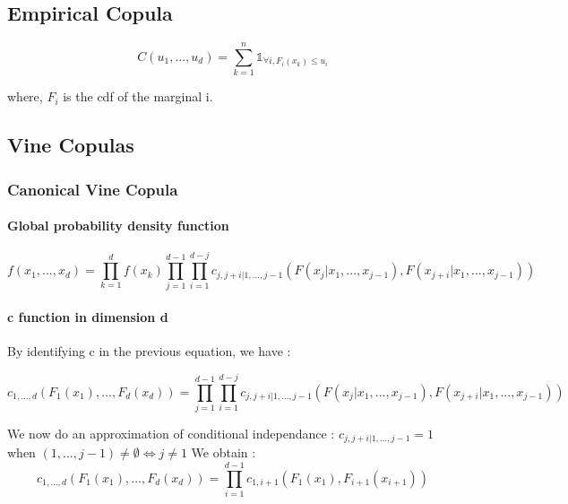 \documentclass{article}
\begin{document}
	\subsection{Empirical Copula}
	\begin{equation*}
	C(u_1,...,u_d) = \sum_{k=1}^n \mathds{1}_{\forall i, F_i(x_k)\leq u_i} 
	\end{equation*}	
	
	where, $F_i$ is the cdf of the marginal i.
	
	
	\subsection{Vine Copulas}
	
	\subsubsection{Canonical Vine Copula}
	
	\paragraph{Global probability density function}
	
	\begin{equation*}
		f(x_1,...,x_d)= \prod_{k=1}^d f(x_k) \prod_{j=1}^{d-1} \prod_{i=1}^{d-j} c_{j,j+i|1,...,j-1}(F(x_j|x_1,...,x_{j-1}),F(x_{j+i}|x_1,...,x_{j-1}))
	\end{equation*}
	
	\paragraph{c function in dimension d}	
	By identifying c in the previous equation, we have :
	
	\begin{equation*}
		c_{1,...,d}(F_1(x_1),...,F_d(x_d))=  \prod_{j=1}^{d-1} \prod_{i=1}^{d-j} c_{j,j+i|1,...,j-1}(F(x_j|x_1,...,x_{j-1}),F(x_{j+i}|x_1,...,x_{j-1}))
	\end{equation*}
	
	We now do an approximation of conditional independance : \newline
	\begin{math} c_{j,j+i|1,...,j-1}=1 \end{math} when \begin{math} (1,...,j-1) \neq \emptyset \Leftrightarrow j \neq 1\end{math}
	\newline
	\newline
	We obtain :\newline
	\begin{equation*}
		c_{1,...,d}(F_1(x_1),...,F_d(x_d)) = \prod_{i=1}^{d-1} c_{1,i+1} (F_1(x_1),F_{i+1}(x_{i+1}))
	\end{equation*}	
	
\end{document}
